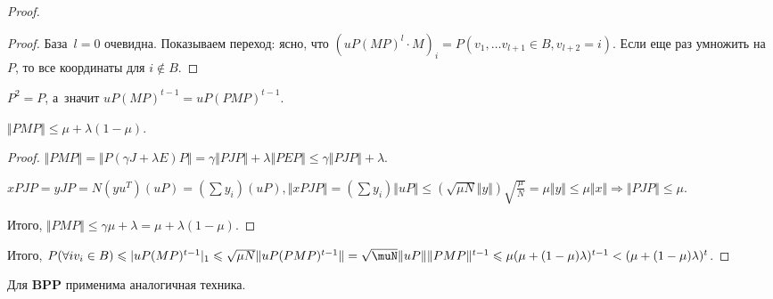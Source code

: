\documentclass{article}
\begin{document}
\begin{proof}
\begin{proof}
		База~$l = 0$ очевидна. Показываем переход: ясно, что $(uP(MP)^l \cdot M)_i =
		P(v_1, \ldots v_{l+1} \in B, v_{l+2} = i)$. Если еще раз умножить на $P$, то
		все координаты для $i \notin B$.
	\end{proof}

	$P^2 = P$, а~значит $uP(MP)^{t-1} = uP(PMP)^{t-1}$.

	\begin{claim}
		$\Vert PMP \Vert \le \mu + \lambda(1 - \mu)$.
	\end{claim}
	\begin{proof}
		$\Vert PMP \Vert = \Vert P(\gamma J + \lambda E) P \Vert = \gamma \Vert PJP
		\Vert + \lambda \Vert PEP \Vert \le \gamma \Vert PJP \Vert + \lambda$.

		$xPJP = yJP = N(yu^T)(uP) = (\sum y_i) (uP), \Vert xPJP \Vert = (\sum y_i)
		\Vert uP \Vert \le (\sqrt{\mu N} \Vert y \Vert) \sqrt{\frac{\mu}{N}} = \mu
		\Vert y \Vert \le \mu \Vert x \Vert \Rightarrow \Vert PJP \Vert \le \mu$.

		Итого, $\Vert PMP \Vert \le \gamma \mu + \lambda = \mu + \lambda(1 - \mu)$.
	\end{proof}

	Итого, $P(\forall i v_i \in B) \le |uP(MP)^{t-1}|_1 \le \sqrt{\mu N} \Vert
	uP(PMP)^{t-1} \Vert = \sqrt{\muN} \Vert uP \Vert \Vert PMP \Vert^{t-1} \le \mu
	(\mu + (1 - \mu)\lambda)^{t-1} < (\mu + (1 - \mu) \lambda)^t$.
\end{proof}

Для \textbf{BPP} применима аналогичная техника.
\end{document}
